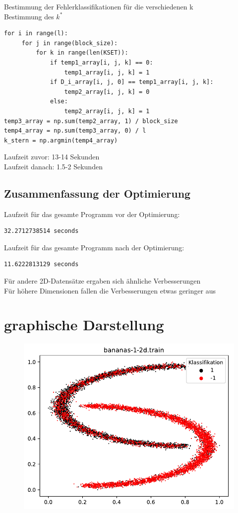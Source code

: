 \documentclass{beamer}
\begin{document}
\begin{frame}[fragile]
Bestimmung der Fehlerklassifikationen für die verschiedenen k\\
Bestimmung des $k^*$
\begin{verbatim}
for i in range(l):
     for j in range(block_size):
         for k in range(len(KSET)):
             if temp1_array[i, j, k] == 0:
                 temp1_array[i, j, k] = 1
             if D_i_array[i, j, 0] == temp1_array[i, j, k]:
                 temp2_array[i, j, k] = 0
             else:
                 temp2_array[i, j, k] = 1
temp3_array = np.sum(temp2_array, 1) / block_size
temp4_array = np.sum(temp3_array, 0) / l
k_stern = np.argmin(temp4_array)
\end{verbatim}
Laufzeit zuvor: 13-14 Sekunden\\
Laufzeit danach: 1.5-2 Sekunden
\end{frame}

\subsection{Zusammenfassung der Optimierung}
\begin{frame}[fragile]
Laufzeit für das gesamte Programm vor der Optimierung:
\begin{verbatim}
32.2712738514 seconds
\end{verbatim}
Laufzeit für das gesamte Programm nach der Optimierung:
\begin{verbatim}
11.6222813129 seconds
\end{verbatim}
Für andere 2D-Datensätze ergaben sich ähnliche Verbesserungen\\
Für höhere Dimensionen fallen die Verbesserungen etwas geringer aus
\end{frame}

\section{graphische Darstellung}
\begin{figure}[h]
\centering
\includegraphics[scale=0.7]{bananas-1-2d-train.pdf}
\label{bananas}
\end{figure}
\end{document}
